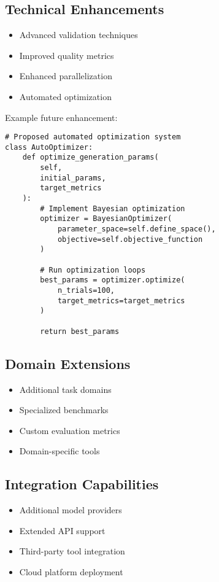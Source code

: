 \documentclass[10pt,conference]{IEEEtran}
\begin{document}
\subsection{Technical Enhancements}
\begin{itemize}
    \item Advanced validation techniques
    \item Improved quality metrics
    \item Enhanced parallelization
    \item Automated optimization
\end{itemize}

Example future enhancement:
\begin{lstlisting}
# Proposed automated optimization system
class AutoOptimizer:
    def optimize_generation_params(
        self,
        initial_params,
        target_metrics
    ):
        # Implement Bayesian optimization
        optimizer = BayesianOptimizer(
            parameter_space=self.define_space(),
            objective=self.objective_function
        )
        
        # Run optimization loops
        best_params = optimizer.optimize(
            n_trials=100,
            target_metrics=target_metrics
        )
        
        return best_params
\end{lstlisting}

\subsection{Domain Extensions}
\begin{itemize}
    \item Additional task domains
    \item Specialized benchmarks
    \item Custom evaluation metrics
    \item Domain-specific tools
\end{itemize}

\subsection{Integration Capabilities}
\begin{itemize}
    \item Additional model providers
    \item Extended API support
    \item Third-party tool integration
    \item Cloud platform deployment
\end{itemize}
\end{document}
